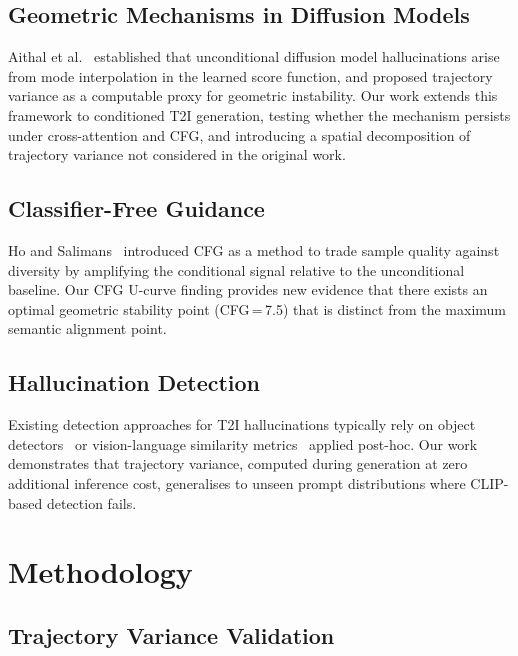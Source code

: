 \documentclass[conference]{IEEEtran}
\begin{document}
\subsection{Geometric Mechanisms in Diffusion Models}
Aithal et al.~\cite{yi2024understanding} established that unconditional
diffusion model hallucinations arise from mode interpolation in the
learned score function, and proposed trajectory variance as a
computable proxy for geometric instability. Our work extends this
framework to conditioned T2I generation, testing whether the mechanism
persists under cross-attention and CFG, and introducing a spatial
decomposition of trajectory variance not considered in the original
work.

\subsection{Classifier-Free Guidance}
Ho and Salimans~\cite{ho2022cfg} introduced CFG as a method to trade
sample quality against diversity by amplifying the conditional signal
relative to the unconditional baseline. Our CFG U-curve finding
provides new evidence that there exists an optimal geometric stability
point (CFG\,=\,7.5) that is distinct from the maximum semantic
alignment point.

\subsection{Hallucination Detection}
Existing detection approaches for T2I hallucinations typically rely
on object detectors~\cite{wang2024yolov10} or vision-language
similarity metrics~\cite{radford2021clip} applied post-hoc. Our
work demonstrates that trajectory variance, computed during generation
at zero additional inference cost, generalises to unseen prompt
distributions where CLIP-based detection fails.

\section{Methodology}
\label{sec:methodology}

\subsection{Trajectory Variance Validation}
\label{sec:validation}
\end{document}
